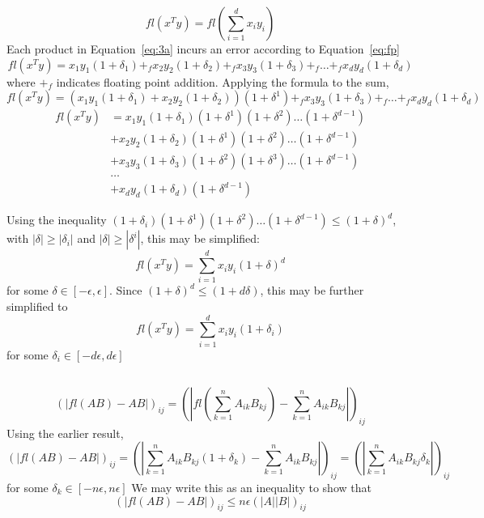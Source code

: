 \documentclass[11pt]{article} %
\begin{document}
\begin{equation}
fl(x^T y ) = fl \left ( \sum_{i=1}^d x_i y_i \right )
\label{eq:3a}
\end{equation}
Each product in Equation~\ref{eq:3a} incurs an error according to Equation~\ref{eq:fp}
\begin{equation}
fl(x^T y ) = x_1 y_1 (1+\delta_1) +_{f} x_2 y_2 (1+\delta_2) +_{f} x_3 y_3 (1+\delta_3)+_{f}  \hdots +_{f} x_d y_d (1+\delta_d) 
\end{equation}
where $+_f$ indicates floating point addition. Applying the formula to the sum,
\begin{equation}
fl(x^T y ) =  \left ( x_1 y_1 (1+\delta_1) + x_2 y_2 (1+\delta_2) \right ) (1+\delta^1) +_f x_3 y_3 (1+\delta_3)+_f \hdots +_f x_d y_d (1+\delta_d) 
\end{equation}
\begin{equation}
\begin{split}
fl(x^T y ) &=  x_1 y_1 (1+\delta_1)(1+\delta^1)(1+\delta^2) \hdots (1+\delta^{d-1})  \\
           &+ x_2 y_2 (1+\delta_2)  (1+\delta^1) (1+\delta^2) \hdots (1 +\delta^{d-1}) \\
	& + x_3 y_3 (1+\delta_3)(1+\delta^2) (1+\delta^3)\hdots (1 +\delta^{d-1} ) \\
	& \hdots \\
	& + x_d y_d (1+\delta_d) (1+\delta^{d-1})
\end{split}
\end{equation}

Using the inequality $ (1+\delta_i)(1+\delta^1)(1+\delta^2) \hdots (1+\delta^{d-1}) \le (1+\delta)^d$,  with $|\delta| \ge |\delta_i|$ and $|\delta| \ge| \delta^i|$, this may be simplified:
\begin{equation}
fl(x^T y ) = \sum_{i=1}^d x_i y_i (1+\delta)^d
\end{equation}
for some $\delta \in [-\epsilon, \epsilon] $. Since $(1+ \delta)^d \le (1 + d \delta) $, this may be further simplified to
\begin{equation}
\boxed{fl(x^T y ) = \sum_{i=1}^d x_i y_i (1+\delta_i)}
\end{equation}
for some $\delta_i \in [-d\epsilon, d \epsilon] $
\subsection{} %
\begin{equation}
 (|fl(AB) -AB| )_{ij} =( | fl( \sum_{k=1}^n A_{ik}B_{kj} ) -  \sum_{k=1}^n A_{ik}B_{kj} | )_{ij}
\end{equation}
Using the earlier result,
\begin{equation}
 (|fl(AB) -AB| )_{ij} =( |  \sum_{k=1}^n A_{ik}B_{kj} (1+\delta_k) -  \sum_{k=1}^n A_{ik}B_{kj} | )_{ij} = ( |  \sum_{k=1}^n A_{ik}B_{kj} \delta_k | )_{ij}
\end{equation}
for some $\delta_k \in [-n \epsilon, n \epsilon] $
We may write this as an inequality to show that
\begin{equation}
\boxed{ (|fl(AB) -AB| )_{ij} \le n \epsilon ( | A || B | )_{ij}}
\end{equation}
\end{document}

